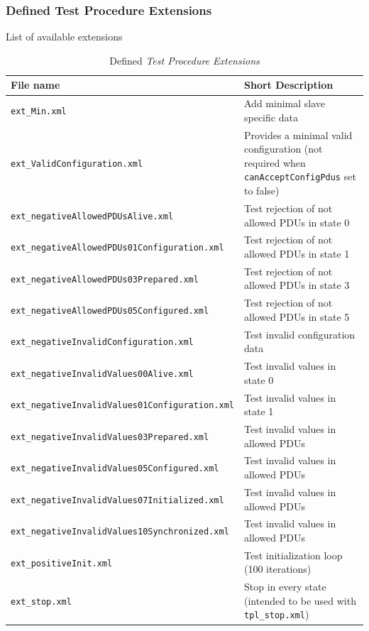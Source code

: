\documentclass[a4paper]{scrartcl}
\theoremstyle{definition}
\begin{document}
\subsubsection{Defined Test Procedure Extensions}
List of available extensions

\begin{table}[H]
	\centering
	\footnotesize
		\begin{tabular}{lp{8cm}}
		File name & Short Description \\ \hline
		\texttt{ext\_Min.xml}	&	Add minimal slave specific data \\
		\texttt{ext\_ValidConfiguration.xml} &	Provides a minimal valid configuration (not required when \texttt{canAcceptConfigPdus} set to false) \\
		\texttt{ext\_negativeAllowedPDUsAlive.xml}           & Test rejection of not allowed PDUs in state 0	\\
		\texttt{ext\_negativeAllowedPDUs01Configuration.xml}	& Test rejection of not allowed PDUs in state 1	\\
		\texttt{ext\_negativeAllowedPDUs03Prepared.xml}	& Test rejection of not allowed PDUs in state 3 \\
		\texttt{ext\_negativeAllowedPDUs05Configured.xml}	& Test rejection of not allowed PDUs in state 5	\\
		\texttt{ext\_negativeInvalidConfiguration.xml}   	& Test invalid configuration data	\\
		\texttt{ext\_negativeInvalidValues00Alive.xml}	& Test invalid values in state 0 \\
		\texttt{ext\_negativeInvalidValues01Configuration.xml}	& Test invalid values in state 1 \\
		\texttt{ext\_negativeInvalidValues03Prepared.xml}	& Test invalid values in allowed PDUs \\
		\texttt{ext\_negativeInvalidValues05Configured.xml}	& Test invalid values in allowed PDUs	\\
		\texttt{ext\_negativeInvalidValues07Initialized.xml}	& Test invalid values in allowed PDUs	\\
		\texttt{ext\_negativeInvalidValues10Synchronized.xml}	& Test invalid values in allowed PDUs	\\
		\texttt{ext\_positiveInit.xml}	&	Test initialization loop (100 iterations) \\
		\texttt{ext\_stop.xml}	&	Stop in every state (intended to be used with \texttt{tpl\_stop.xml})	\\ \hline
		\end{tabular}
	\caption{Defined \textit{Test Procedure Extensions}}
	\label{tab:TestProcedureExtensions}
\end{table}
\end{document}
